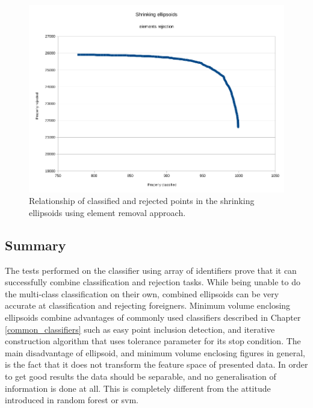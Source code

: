 \begin{figure}[htp]
	\centering
	\includegraphics[width=1.\textwidth]{Figures/shrinking_ellipsoid_elements_rejection2.png}
	\caption{ Relationship of classified and rejected points in the shrinking ellipsoids using element removal approach. }
	\label{fig:shrinking_ellipsoids_elements_rejection2}\vspace{-3pt}
\end{figure}

\subsection{Summary}

The tests performed on the classifier using array of identifiers prove that it can successfully combine classification and rejection tasks. While being unable to do the multi-class classification on their own, combined ellipsoids can be very accurate at classification and rejecting foreigners. Minimum volume enclosing ellipsoids combine advantages of commonly used classifiers described in Chapter \ref{common_classifiers} such as easy point inclusion detection, and iterative construction algorithm that uses tolerance parameter for its stop condition. The main disadvantage of ellipsoid, and minimum volume enclosing figures in general, is the fact that it does not transform the feature space of presented data. In order to get good results the data should be separable, and no generalisation of information is done at all. This is completely different from the attitude introduced in random forest or svm.
